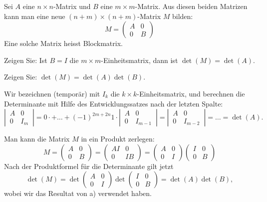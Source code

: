 Sei $A$ eine $n\times n$-Matrix und $B$ eine $m\times m$-Matrix. Aus diesen beiden
Matrizen kann man eine neue $(n+m)\times(n+m)$-Matrix $M$ bilden:
\[
M=\begin{pmatrix}
A&0\\
0&B
\end{pmatrix}
\]
Eine solche Matrix heisst Blockmatrix.
\begin{teilaufgaben}
\item
Zeigen Sie:
Ist $B=I$ die $m\times m$-Einheitsmatrix, dann ist $\det(M)=\det(A)$.
\item
Zeigen Sie:
$\det(M)=\det(A)\det(B)$.
\end{teilaufgaben}


\begin{loesung}
\begin{teilaufgaben}
\item Wir bezeichnen (temporär) mit $I_k$ die $k\times k$-Einheitsmatrix,
und berechnen die Determinante mit Hilfe des Entwicklungssatzes nach der
letzten Spalte:
\[
\left|\,
\begin{matrix}
A&0\\
0&I_m
\end{matrix}
\,\right|
=0\cdot +\dots+(-1)^{2m+2n}1\cdot
\left|\,
\begin{matrix}
A&0\\
0&I_{m-1}
\end{matrix}
\,\right|
=
\left|\,
\begin{matrix}
A&0\\
0&I_{m-2}
\end{matrix}
\,\right|
=\dots=
\det(A).
\]

\item
Man kann die Matrix $M$ in ein Produkt zerlegen:
\[
M=
\begin{pmatrix}
A&0\\
0&B
\end{pmatrix}
=
\begin{pmatrix}
AI&0\\
0&IB
\end{pmatrix}
=
\begin{pmatrix}
A&0\\
0&I
\end{pmatrix}
\begin{pmatrix}
I&0\\
0&B
\end{pmatrix}
\]
Nach der Produktformel für die Determinante gilt jetzt
\[
\det(M) =
\det
\begin{pmatrix}
A&0\\
0&I
\end{pmatrix}
\det
\begin{pmatrix}
I&0\\
0&B
\end{pmatrix}
=\det(A)\det(B),
\]
wobei wir das Resultat von a) verwendet haben.
\qedhere
\end{teilaufgaben}
\end{loesung}

